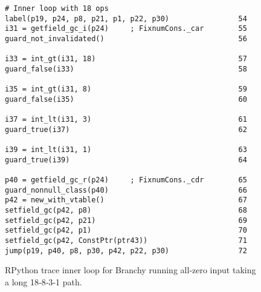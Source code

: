 \begin{figure}[!h]
  \centering
  \begin{minipage}{0.7\textwidth}
    \begin{lstlisting}[style=rptrace-style]
# Inner loop with 18 ops
label(p19, p24, p8, p21, p1, p22, p30)                54
i31 = getfield_gc_i(p24)     ; FixnumCons._car        55
guard_not_invalidated()                               56

i33 = int_gt(i31, 18)                                 57
guard_false(i33)                                      58

i35 = int_gt(i31, 8)                                  59
guard_false(i35)                                      60

i37 = int_lt(i31, 3)                                  61
guard_true(i37)                                       62

i39 = int_lt(i31, 1)                                  63
guard_true(i39)                                       64

p40 = getfield_gc_r(p24)     ; FixnumCons._cdr        65
guard_nonnull_class(p40)                              66
p42 = new_with_vtable()                               67
setfield_gc(p42, p8)                                  68
setfield_gc(p42, p21)                                 69
setfield_gc(p42, p1)                                  70
setfield_gc(p42, ConstPtr(ptr43))                     71
jump(p19, p40, p8, p30, p42, p22, p30)                72\end{lstlisting}
  \end{minipage}
  \caption{RPython trace inner loop for Branchy running all‑zero input taking a long 18‑8‑3‑1 path.}
  \label{fig:branchy-long-path-trace}
\end{figure}
